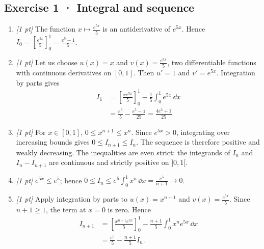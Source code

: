 \subsection*{Exercise 1 · Integral and sequence}\begin{enumerate}

\item \textit{[1 pt]} The function $x\mapsto \frac{e^{5x}}{5}$ is an antiderivative of $e^{5x}$. Hence $I_0=[\frac{e^{5x}}{5}]_0^1=\frac{e^{5}-1}{5}$.

\item \textit{[1 pt]} Let us choose $u(x)=x$ and $v(x)=\frac{e^{5x}}{5}$, two differentiable functions with continuous derivatives on $[0,1]$. Then $u'=1$ and $v'=e^{5x}$. Integration by parts gives
\[\begin{aligned}I_1&=\left[\frac{xe^{5x}}{5}\right]_0^1-\frac{1}{5}\int_0^1e^{5x}\,\dd x\\&=\frac{e^{5}}{5}-\frac{e^{5}-1}{25}=\frac{4e^{5}+1}{25}.\end{aligned}\]

\item \textit{[1 pt]} For $x\in[0,1]$, $0\le x^{n+1}\le x^n$. Since $e^{5x}>0$, integrating over increasing bounds gives $0\le I_{n+1}\le I_n$. The sequence is therefore positive and weakly decreasing. The inequalities are even strict: the integrands of $I_n$ and $I_n-I_{n+1}$ are continuous and strictly positive on $]0,1[$.

\item \textit{[1 pt]} $e^{5x}\le e^{5}$; hence $0\le I_n\le e^{5}\int_0^1x^n\,\dd x=\frac{e^{5}}{n+1}\to0$.

\item \textit{[1 pt]} Apply integration by parts to $u(x)=x^{n+1}$ and $v(x)=\frac{e^{5x}}{5}$. Since $n+1\ge1$, the term at $x=0$ is zero. Hence
\[\begin{aligned}I_{n+1}&=\left[\frac{x^{n+1}e^{5x}}{5}\right]_0^1-\frac{n+1}{5}\int_0^1x^ne^{5x}\,\dd x\\&=\frac{e^{5}}{5}-\frac{n+1}{5}I_n.\end{aligned}\]

\end{enumerate}

